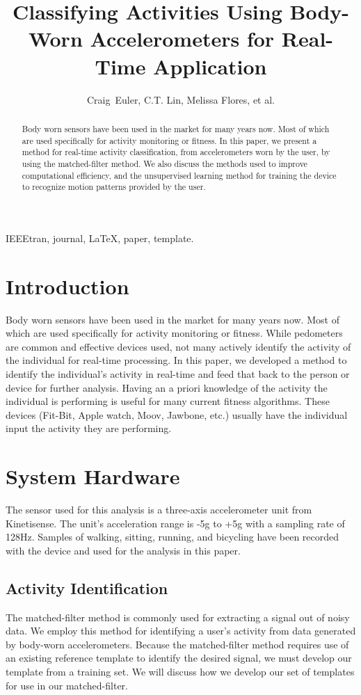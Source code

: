 \documentclass[journal]{IEEEtran}
\begin{document}
%
\title{Classifying Activities Using Body-Worn Accelerometers for Real-Time Application}
%
\author{Craig~Euler, C.T. Lin, Melissa Flores, et al.}
%
\maketitle
%
\begin{abstract}
Body worn sensors have been used in the market for many years now. Most of which are used specifically for activity monitoring or fitness. In this paper, we present a method for real-time activity classification, from accelerometers worn by the user, by using the matched-filter method. We also discuss the methods used to improve computational efficiency, and the unsupervised learning method for training the device to recognize motion patterns provided by the user.
\end{abstract}
%
\begin{IEEEkeywords}
IEEEtran, journal, \LaTeX, paper, template.
\end{IEEEkeywords}
\IEEEpeerreviewmaketitle
%
\section{Introduction}
Body worn sensors have been used in the market for many years now. Most of which are used specifically for activity monitoring or fitness. While pedometers are common and effective devices used, not many actively identify the activity of the individual for real-time processing. In this paper, we developed a method to identify the individual’s activity in real-time and feed that back to the person or device for further analysis. Having an a priori knowledge of the activity the individual is performing is useful for many current fitness algorithms. These devices (Fit-Bit, Apple watch, Moov, Jawbone, etc.) usually have the individual input the activity they are performing.
%
\section{System Hardware}
The sensor used for this analysis is a three-axis accelerometer unit from Kinetisense. The unit’s acceleration range is -5g to +5g with a sampling rate of 128Hz. Samples of walking, sitting, running, and bicycling have been recorded with the device and used for the analysis in this paper.
%
\subsection{Activity Identification}
The matched-filter method is commonly used for extracting a signal out of noisy data. We employ this method for identifying a user’s activity from data generated by body-worn accelerometers. Because the matched-filter method requires use of an existing reference template to identify the desired signal, we must develop our template from a training set. We will discuss how we develop our set of templates for use in our matched-filter.
%
\end{document}
